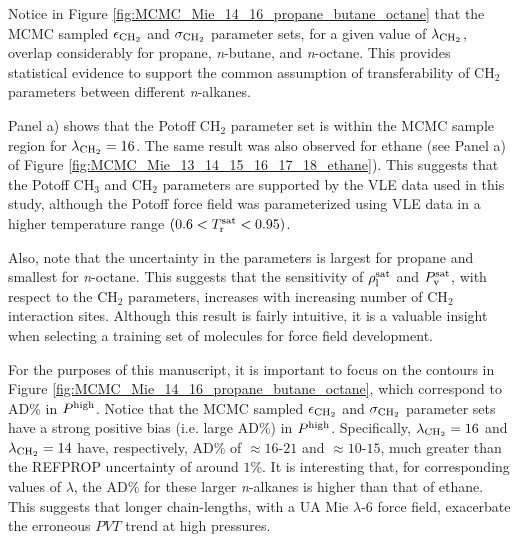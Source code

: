 \documentclass[journal=jctc,manuscript=article]{achemso}
\begin{document}

Notice in Figure \ref{fig:MCMC_Mie_14_16_propane_butane_octane} that the MCMC sampled $\epsilon_{\rm CH_2}$ and $\sigma_{\rm CH_2}$ parameter sets, for a given value of $\lambda_{\rm CH_2}$, overlap considerably for propane, \textit{n}-butane, and \textit{n}-octane. This provides statistical evidence to support the common assumption of transferability of CH$_2$ parameters between different \textit{n}-alkanes. 

Panel a) shows that the Potoff CH$_2$ parameter set is within the MCMC sample region for $\lambda_{\rm CH_2} = 16$. The same result was also observed for ethane (see Panel a) of Figure \ref{fig:MCMC_Mie_13_14_15_16_17_18_ethane}). This suggests that the Potoff CH$_3$ and CH$_2$ parameters are supported by the VLE data used in this study, although the Potoff force field was parameterized using VLE data in a higher temperature range $(0.6 < T_{\rm r}^{\rm sat} < 0.95)$. 

Also, note that the uncertainty in the parameters is largest for propane and smallest for \textit{n}-octane. This suggests that the sensitivity of $\rho_{\rm l}^{\rm sat}$ and $P_{\rm v}^{\rm sat}$, with respect to the CH$_2$ parameters, increases with increasing number of CH$_2$ interaction sites. Although this result is fairly intuitive, it is a valuable insight when selecting a training set of molecules for force field development.

For the purposes of this manuscript, it is important to focus on the contours in Figure \ref{fig:MCMC_Mie_14_16_propane_butane_octane}, which correspond to AD\% in $P^{\rm high}$. Notice that the MCMC sampled $\epsilon_{\rm CH_2}$ and $\sigma_{\rm CH_2}$ parameter sets have a strong positive bias (i.e. large AD\%) in $P^{\rm high}$. Specifically, $\lambda_{\rm CH_2} = 16$ and $\lambda_{\rm CH_2} = 14$ have, respectively, AD\% of $\approx 16$-$21$ and $\approx 10$-$15$, much greater than the REFPROP uncertainty of around $1$\%. It is interesting that, for corresponding values of $\lambda$, the AD\% for these larger \textit{n}-alkanes is higher than that of ethane. This suggests that longer chain-lengths, with a UA Mie $\lambda$-6 force field, exacerbate the erroneous $PVT$ trend at high pressures.
\end{document}
